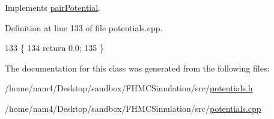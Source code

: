 Implements \hyperlink{classpair_potential_a5387d21d8d487d1d42e9eaf7cae9175b}{pair\-Potential}.



Definition at line 133 of file potentials.\-cpp.


\begin{DoxyCode}
133                                                           \{
134     \textcolor{keywordflow}{return} 0.0;
135 \}
\end{DoxyCode}


The documentation for this class was generated from the following files\-:\begin{DoxyCompactItemize}
\item 
/home/nam4/\-Desktop/sandbox/\-F\-H\-M\-C\-Simulation/src/\hyperlink{potentials_8h}{potentials.\-h}\item 
/home/nam4/\-Desktop/sandbox/\-F\-H\-M\-C\-Simulation/src/\hyperlink{potentials_8cpp}{potentials.\-cpp}\end{DoxyCompactItemize}
